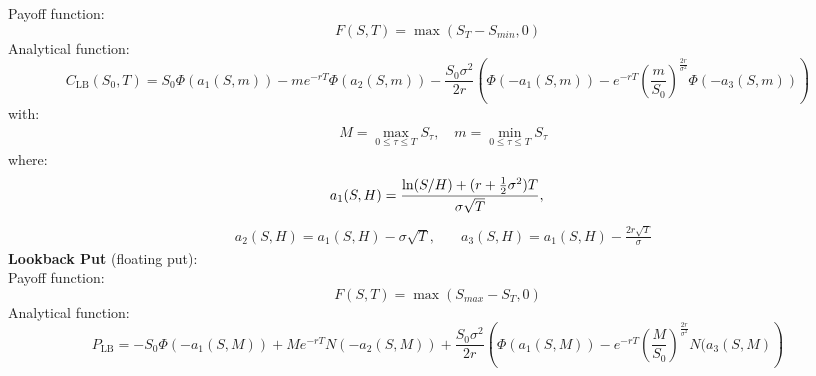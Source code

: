 \documentclass[11pt]{article}
\begin{document}
Payoff function:
\begin{equation}
    F(S,T) = \max(S_T - S_{min},0)
\end{equation}
Analytical function:
\begin{equation}
    C_{\text{LB}}(S_0,T)=S_{0}\Phi(a_{1}(S,m))-m e^{-rT}\Phi(a_{2}(S,m))
    -\frac{S_{0}\sigma^{2}}{2r}\left(\Phi(-a_{1}(S,m))-e^{-rT}\left(\frac{m}{S_{0}}\right)^{\frac{2r}{\sigma^{2}}}\Phi(-a_{3}(S,m))\right)
\end{equation}
with:
\begin{align}
    &M= \max_{0\leq \tau \leq T}S_{\tau}, \quad m= \min_{0\leq\tau\leq T}S_{\tau}
\end{align}
where:
\begin{equation}
        a_{1}(S,H)=\frac{\ln(S/H)+(r+\tfrac{1}{2}\sigma^{2})T}{\sigma\sqrt{T}},\quad\\
\end{equation}
\begin{align}
    &a_{2}(S,H)=a_{1}(S,H)-\sigma\sqrt{T},\quad
    &a_{3}(S,H)=a_{1}(S,H)-\frac{2r\sqrt{T}}{\sigma}
\end{align}
\textbf{Lookback Put} (floating put):\\
Payoff function:
\begin{equation}
    F(S,T) = \max(S_{max} - S_T,0)
\end{equation}
Analytical function:
\begin{equation}
    P_{\text{LB}}=-S_{0}\Phi(-a_{1}(S,M))+M e^{-rT}N(-a_{2}(S,M))
    +\frac{S_{0}\sigma^{2}}{2r}\left(\Phi(a_{1}(S,M))-e^{-rT}\left(\frac{M}{S_{0}}\right)^{\frac{2r}{\sigma^{2}}}N(a_{3}(S,M)\right)
\end{equation}
\end{document}
